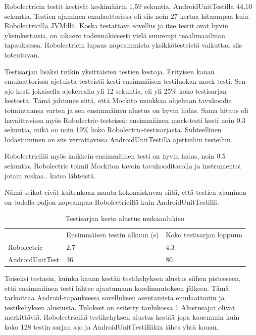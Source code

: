Robolectricin testit kestivät keskimäärin 1,59 sekuntia, AndroidUnitTestilla 44,10 sekuntia. Testien ajaminen emulaattorissa oli siis noin 27 kertaa hitaampaa kuin Robolectricilla JVM:llä. Koska testattava sovellus ja itse testit ovat hyvin yksinkertaisia, on aikaero todennäköisesti vielä suurempi reaalimaailman tapauksessa. Robolectricin lupaus nopeammista yksikkötesteistä vaikuttaa siis toteutuvan.

Testisarjan lisäksi tutkin yksittäisten testien kestoja. Erityisen kauan emulaattorissa ajetuista testeistä kesti ensimmäisen testiluokan mock-testi. Sen ajo kesti jokaisella ajokerralla yli 12 sekuntia, eli yli 25\% koko testisarjan kestosta. Tämä johtunee siitä, että Mockito muokkaa ohjelman tavukoodia toimintaansa varten ja sen ensimmäinen alustus on hyvin hidas. Sama hitaus oli havaittavissa myös Robolectric-testeissä: ensimmäinen mock-testi kesti noin 0.3 sekuntia, mikä on noin 19\% koko Robolectric-testisarjasta. Suhteellinen hidastuminen on siis verrattavissa AndroidUnitTestillä ajettuihin testeihin.

Robolectricillä myös kaikkein ensimmäinen testi on hyvin hidas, noin 0.5 sekuntia. Robolectric toimii Mockiton tavoin tavukooditasolla ja instrumentoi jotain roskaa.. katso lähteistä.

Nämä seikat eivät kuitenkaan muuta kokonaiskuvaa siitä, että testien ajaminen on todella paljon nopeampaa Robolectricillä kuin AndroidUnitTestillä.

\begin{table}[h]
\centering
\begin{tabular}{ l l l }
   & Ensimmäisen testin alkuun (s) & Koko testisarjan loppuun \\
  Robolectric & 2.7 & 4.3 \\
  AndroidUnitTest & 36 & 80 \\
\end{tabular}
\caption{Testisarjan kesto alustus mukaanlukien}
\label{unittest_startup}
\end{table}

Toiseksi testasin, kuinka kauan kestää testikehyksen alustus siihen pisteeseen, että ensimmäinen testi lähtee ajautumaan koodimuutoksen jälkeen. Tämä tarkoittaa Android-tapauksessa sovelluksen asentamista emulaattoriin ja testikehyksen alustusta. Tulokset on esitetty taulukossa \ref{unittest_startup} Alustusajat olivat merkittäviä. Robolectricillä testikehyksen alustus kestää jopa kauemmin kuin koko 128 testin sarjan ajo ja AndroidUnitTestilläkin lähes yhtä kauan.

